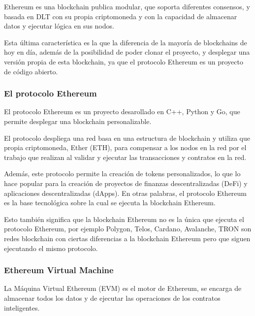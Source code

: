 Ethereum\cite{Ethereum} es una blockchain publica modular, que soporta diferentes consensos, y basada en DLT con su propia criptomoneda y con la capacidad de almacenar datos y ejecutar lógica en sus nodos.

\bigskip

Esta última característica es la que la diferencia de la mayoría de blockchains de hoy en día, además de la posibilidad de poder clonar el proyecto, y desplegar una versión propia de esta blockchain, ya que el protocolo Ethereum es un proyecto de código abierto.

\subsubsection{El protocolo Ethereum}

El protocolo Ethereum\cite{gitether} es un proyecto desarollado en C++, Python y Go, que permite desplegar una blockchain personalizable.

\bigskip

El protocolo despliega una red basa en una estructura de blockchain y utiliza que propia criptomoneda, Ether (ETH), para compensar a los nodos en la red por el trabajo que realizan al validar y ejecutar las transacciones y contratos en la red.

\bigskip

Además, este protocolo permite la creación de tokens\cite{token} personalizados, lo que lo hace popular para la creación de proyectos de finanzas descentralizadas (DeFi) y aplicaciones descentralizadas (dApps). En otras palabras, el protocolo Ethereum es la base tecnológica sobre la cual se ejecuta la blockchain Ethereum.

\bigskip

Esto también significa que la blockchain Ethereum no es la única que ejecuta el protocolo Ethereum, por ejemplo Polygon, Telos, Cardano, Avalanche, TRON son redes blockchain con ciertas diferencias a la blockchain Ethereum pero que siguen ejecutando el mismo protocolo.


\subsubsection{Ethereum Virtual Machine}

La Máquina Virtual Ethereum (EVM)\cite{evm} es el motor de Ethereum, se encarga de almacenar todos los datos y de ejecutar las operaciones de los contratos inteligentes.

\bigskip

